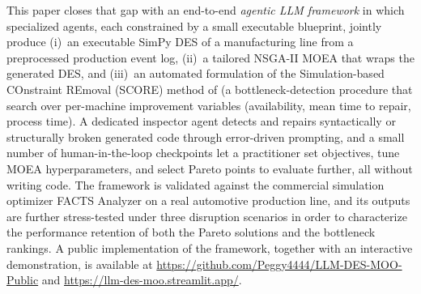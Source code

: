 \documentclass[a4paper,fleqn]{cas-sc}
\begin{document}
  This paper closes that gap with an end-to-end \emph{agentic LLM framework} in which specialized agents, each constrained by a small executable blueprint, jointly produce (i)~an executable SimPy DES of a manufacturing line from a preprocessed production event log, (ii)~a tailored NSGA-II MOEA that wraps the generated DES, and (iii)~an automated formulation of the Simulation-based COnstraint REmoval (SCORE) method of \citet{Bernedixen2015} (a bottleneck-detection procedure that search over per-machine improvement variables (availability, mean time to repair, process time). A dedicated inspector agent detects and repairs syntactically or structurally broken generated code through error-driven prompting, and a small number of human-in-the-loop checkpoints let a practitioner set objectives, tune MOEA hyperparameters, and select Pareto points to evaluate further, all without writing code. The framework is validated against the commercial simulation optimizer FACTS Analyzer on a real automotive production line, and its outputs are further stress-tested under three disruption scenarios in order to characterize the performance retention of both the Pareto solutions and the bottleneck rankings. A public implementation of the framework,        
  together with an interactive demonstration, is available at \url{https://github.com/Peggy4444/LLM-DES-MOO-Public} and 
  \url{https://llm-des-moo.streamlit.app/}.
\end{document}
